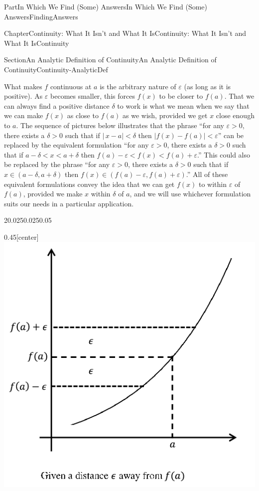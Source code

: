 \documentclass[oneside,10pt,]{book}
\numberwithin{equation}{part}
\newcommand{\eps}{\varepsilon}
\newcommand{\lt}{<}
\begin{document}
\begin{partptx}{Part}{In Which We Find (Some) Answers}{}{In Which We Find (Some) Answers}{}{}{FindingAnswers}
\begin{chapterptx}{Chapter}{Continuity: What It Isn't and What It Is}{}{Continuity: What It Isn't and What It Is}{}{}{Continuity}
\begin{sectionptx}{Section}{An Analytic Definition of Continuity}{}{An Analytic Definition of Continuity}{}{}{Continuity-AnalyticDef}
\par
What makes \(f\) continuous at \(a\) is the arbitrary nature of \(\eps\) (as long as it is positive).  As \(\eps\) becomes smaller, this forces \(f(x)\) to be closer to \(f(a)\).  That we can always find a positive distance \(\delta\) to work is what we mean when we say that we can make \(f(x)\) as close to \(f(a)\) as we wish, provided we get \(x\) close enough to \(a\).  The sequence of pictures below illustrates that the phrase ``for any \(\eps>0\), there exists a \(\delta>0\) such that if \(|\,x-a|\lt \delta\) then \(|f(x)-f(a)|\lt \eps\)'' can be replaced by the equivalent formulation ``for any \(\eps>0\), there exists a \(\delta>0\) such that if \(a-\delta\lt x\lt a+\delta\) then \(f(a)-\eps\lt f(x)\lt
f(a)+\eps\).'' This could also be replaced by the phrase ``for any \(\eps>0\), there exists a \(\delta>0\) such that if \(x\in(a-\delta,a+\delta)\) then \(f(x)\in(f(a)-\eps,f(a)+\eps)\).'' All of these equivalent formulations convey the idea that we can get \(f(x)\) to within \(\eps\) of \(f(a)\), provided we make \(x\) within \(\delta\) of \(a\), and we will use whichever formulation suits our needs in a particular application.%
\begin{sidebyside}{2}{0.025}{0.025}{0.05}%
\begin{sbspanel}{0.45}[center]%
\includegraphics[width=\linewidth]{external/images/Ch5fig3a.png}

\end{sbspanel}
\end{sidebyside}
\end{sectionptx}
\end{chapterptx}
\end{partptx}
\end{document}
